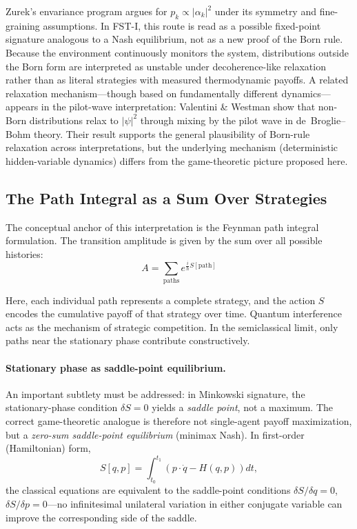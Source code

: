 \documentclass[12pt,a4paper]{article}
\theoremstyle{remark}
\begin{document}
Zurek's envariance program argues for $p_k \propto |\alpha_k|^2$ under its symmetry and fine-graining assumptions. In FST-I, this route is read as a possible fixed-point signature analogous to a Nash equilibrium, not as a new proof of the Born rule. Because the environment continuously monitors the system, distributions outside the Born form are interpreted as unstable under decoherence-like relaxation rather than as literal strategies with measured thermodynamic payoffs. A related relaxation mechanism---though based on fundamentally different dynamics---appears in the pilot-wave interpretation: Valentini \& Westman \citep{ValentiniWestman2005} show that non-Born distributions relax to $|\psi|^2$ through mixing by the pilot wave in de~Broglie--Bohm theory. Their result supports the general plausibility of Born-rule relaxation across interpretations, but the underlying mechanism (deterministic hidden-variable dynamics) differs from the game-theoretic picture proposed here.

\subsection{The Path Integral as a Sum Over Strategies}

The conceptual anchor of this interpretation is the Feynman path integral formulation. The transition amplitude is given by the sum over all possible histories:
\begin{equation}
A = \sum_{\text{paths}} e^{\frac{i}{\hbar} S[\text{path}]}
\end{equation}

Here, each individual path represents a complete strategy, and the action $S$ encodes the cumulative payoff of that strategy over time. Quantum interference acts as the mechanism of strategic competition. In the semiclassical limit, only paths near the stationary phase contribute constructively.

\paragraph{Stationary phase as saddle-point equilibrium.}
An important subtlety must be addressed: in Minkowski signature, the stationary-phase condition $\delta S = 0$ yields a \emph{saddle point}, not a maximum. The correct game-theoretic analogue is therefore not single-agent payoff maximization, but a \emph{zero-sum saddle-point equilibrium} (minimax Nash). In first-order (Hamiltonian) form,
\begin{equation}
S[q,p] = \int_{t_0}^{t_1} \left( p \cdot \dot{q} - H(q,p) \right) dt,
\end{equation}
the classical equations are equivalent to the saddle-point conditions $\delta S / \delta q = 0$, $\delta S / \delta p = 0$---no infinitesimal unilateral variation in either conjugate variable can improve the corresponding side of the saddle.
\end{document}
